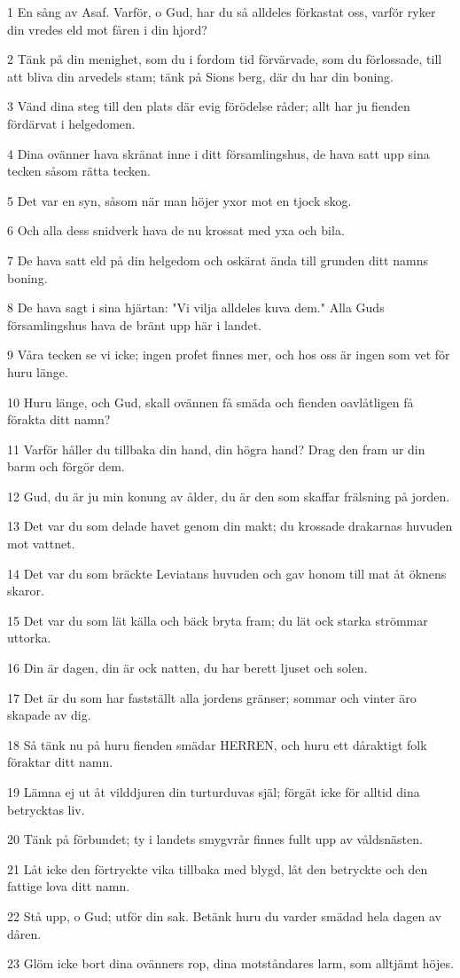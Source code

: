 \par 1 En sång av Asaf. Varför, o Gud, har du så alldeles förkastat oss, varför ryker din vredes eld mot fåren i din hjord?
\par 2 Tänk på din menighet, som du i fordom tid förvärvade, som du förlossade, till att bliva din arvedels stam; tänk på Sions berg, där du har din boning.
\par 3 Vänd dina steg till den plats där evig förödelse råder; allt har ju fienden fördärvat i helgedomen.
\par 4 Dina ovänner hava skränat inne i ditt församlingshus, de hava satt upp sina tecken såsom rätta tecken.
\par 5 Det var en syn, såsom när man höjer yxor mot en tjock skog.
\par 6 Och alla dess snidverk hava de nu krossat med yxa och bila.
\par 7 De hava satt eld på din helgedom och oskärat ända till grunden ditt namns boning.
\par 8 De hava sagt i sina hjärtan: "Vi vilja alldeles kuva dem." Alla Guds församlingshus hava de bränt upp här i landet.
\par 9 Våra tecken se vi icke; ingen profet finnes mer, och hos oss är ingen som vet för huru länge.
\par 10 Huru länge, och Gud, skall ovännen få smäda och fienden oavlåtligen få förakta ditt namn?
\par 11 Varför håller du tillbaka din hand, din högra hand? Drag den fram ur din barm och förgör dem.
\par 12 Gud, du är ju min konung av ålder, du är den som skaffar frälsning på jorden.
\par 13 Det var du som delade havet genom din makt; du krossade drakarnas huvuden mot vattnet.
\par 14 Det var du som bräckte Leviatans huvuden och gav honom till mat åt öknens skaror.
\par 15 Det var du som lät källa och bäck bryta fram; du lät ock starka strömmar uttorka.
\par 16 Din är dagen, din är ock natten, du har berett ljuset och solen.
\par 17 Det är du som har fastställt alla jordens gränser; sommar och vinter äro skapade av dig.
\par 18 Så tänk nu på huru fienden smädar HERREN, och huru ett dåraktigt folk föraktar ditt namn.
\par 19 Lämna ej ut åt vilddjuren din turturduvas själ; förgät icke för alltid dina betrycktas liv.
\par 20 Tänk på förbundet; ty i landets smygvrår finnes fullt upp av våldsnästen.
\par 21 Låt icke den förtryckte vika tillbaka med blygd, låt den betryckte och den fattige lova ditt namn.
\par 22 Stå upp, o Gud; utför din sak. Betänk huru du varder smädad hela dagen av dåren.
\par 23 Glöm icke bort dina ovänners rop, dina motståndares larm, som alltjämt höjes.

